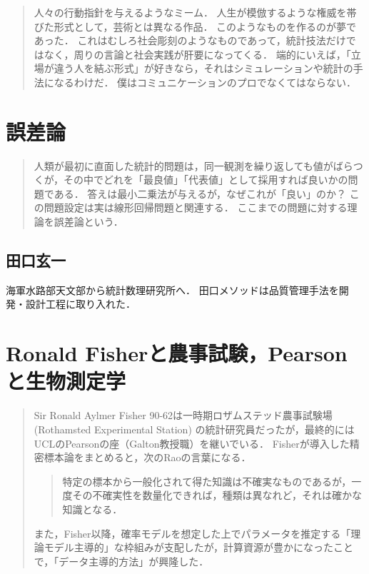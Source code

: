 \documentclass[uplatex,dvipdfmx]{jsreport}
\begin{document}
\begin{quotation}
    人々の行動指針を与えるようなミーム．
    人生が模倣するような権威を帯びた形式として，芸術とは異なる作品．
    このようなものを作るのが夢であった．
    これはむしろ社会彫刻のようなものであって，統計技法だけではなく，周りの言論と社会実践が肝要になってくる．
    端的にいえば，「立場が違う人を結ぶ形式」が好きなら，それはシミュレーションや統計の手法になるわけだ．
    僕はコミュニケーションのプロでなくてはならない．
\end{quotation}

\chapter{誤差論}

\begin{quotation}
    人類が最初に直面した統計的問題は，同一観測を繰り返しても値がばらつくが，その中でどれを「最良値」「代表値」として採用すれば良いかの問題である．
    答えは最小二乗法が与えるが，なぜこれが「良い」のか？
    この問題設定は実は線形回帰問題と関連する．
    ここまでの問題に対する理論を誤差論という．
\end{quotation}

\section{田口玄一}

海軍水路部天文部から統計数理研究所へ．
田口メソッドは品質管理手法を開発・設計工程に取り入れた．

\chapter{Ronald Fisherと農事試験，Pearsonと生物測定学}

\begin{quotation}
    Sir Ronald Aylmer Fisher 90-62は一時期ロザムステッド農事試験場 (Rothamsted Experimental Station) の統計研究員だったが，最終的にはUCLのPearsonの座（Galton教授職）を継いでいる．
    Fisherが導入した精密標本論をまとめると，次のRaoの言葉になる．
    \begin{quote}
        特定の標本から一般化されて得た知識は不確実なものであるが，一度その不確実性を数量化できれば，種類は異なれど，それは確かな知識となる．
    \end{quote}

    また，Fisher以降，確率モデルを想定した上でパラメータを推定する「理論モデル主導的」な枠組みが支配したが，計算資源が豊かになったことで，「データ主導的方法」が興隆した．
\end{quotation}
\end{document}

